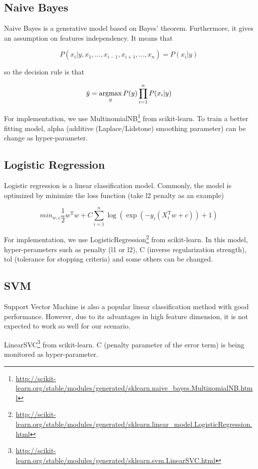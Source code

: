 \documentclass{article}
\begin{document}
\subsection{Naive Bayes}

Naive Bayes is a generative model based on Bayes’ theorem. Furthermore, it gives an assumption on features independency. It means that

$$
P(x_i|y,x_1,\dots,x_{i-1},x_{i+1},\dots,x_n)=P(x_i|y)
$$

so the decision rule is that

\newcommand{\argmax}{\operatornamewithlimits{argmax}}
$$
\hat{y}=\argmax_yP(y)\prod_{i=1}^nP(x_i|y)
$$

For implementation, we use MultinomialNB\footnote{\url{http://scikit-learn.org/stable/modules/generated/sklearn.naive_bayes.MultinomialNB.html}} from scikit-learn. To train a better fitting model, alpha (additive (Laplace/Lidstone) smoothing parameter) can be change as hyper-parameter.

\subsection{Logistic Regression}

Logistic regression is a linear classification model. Commonly, the model is optimized by minimize the loss function (take l2 penalty as an example)

$$
min_{w,c}\frac{1}{2}w^\mathrm{T}w+C\sum_{i=1}^n\log(\exp(-y_i(X_i^\mathrm{T}w+c))+1)
$$

For implementation, we use LogisticRegression\footnote{\url{http://scikit-learn.org/stable/modules/generated/sklearn.linear_model.LogisticRegression.html}} from scikit-learn. In this model, hyper-perameters such as penalty (l1 or l2), C (inverse regularization strength), tol (tolerance for stopping criteria) and some others can be changed.

\subsection{SVM}

Support Vector Machine is also a popular linear classification method with good performance. However, due to its advantages in high feature dimension, it is not expected to work so well for our scenario.

LinearSVC\footnote{\url{http://scikit-learn.org/stable/modules/generated/sklearn.svm.LinearSVC.html}} from scikit-learn. C (penalty parameter of the error term) is being monitored as hyper-parameter.
\end{document}
